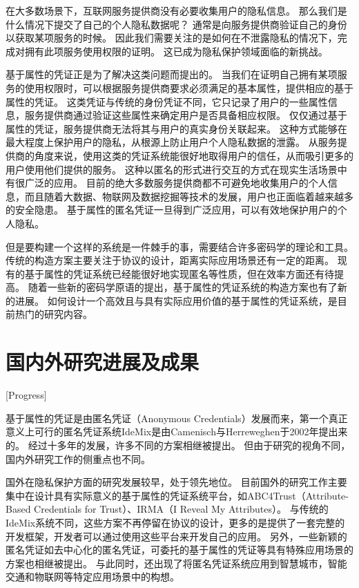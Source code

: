在大多数场景下，互联网服务提供商没有必要收集用户的隐私信息。
那么我们是什么情况下提交了自己的个人隐私数据呢？
通常是向服务提供商验证自己的身份以获取某项服务的时候。
因此我们需要关注的是如何在不泄露隐私的情况下，完成对拥有此项服务使用权限的证明。
这已成为隐私保护领域面临的新挑战。

基于属性的凭证正是为了解决这类问题而提出的。
当我们在证明自己拥有某项服务的使用权限时，可以根据服务提供商要求必须满足的基本属性，提供相应的基于属性的凭证。
这类凭证与传统的身份凭证不同，它只记录了用户的一些属性信息，服务提供商通过验证这些属性来确定用户是否具备相应权限。
仅仅通过基于属性的凭证，服务提供商无法将其与用户的真实身份关联起来。
这种方式能够在最大程度上保护用户的隐私，从根源上防止用户个人隐私数据的泄露。
从服务提供商的角度来说，使用这类的凭证系统能很好地取得用户的信任，从而吸引更多的用户使用他们提供的服务。
这种以匿名的形式进行交互的方式在现实生活场景中有很广泛的应用。
目前的绝大多数服务提供商都不可避免地收集用户的个人信息，而且随着大数据、物联网及数据挖掘等技术的发展，用户也正面临着越来越多的安全隐患。
基于属性的匿名凭证一旦得到广泛应用，可以有效地保护用户的个人隐私。

但是要构建一个这样的系统是一件棘手的事，需要结合许多密码学的理论和工具。
传统的构造方案主要关注于协议的设计，距离实际应用场景还有一定的距离。
现有的基于属性的凭证系统已经能很好地实现匿名等性质，但在效率方面还有待提高。
随着一些新的密码学原语的提出，基于属性的凭证系统的构造方案也有了新的进展。
如何设计一个高效且与具有实际应用价值的基于属性的凭证系统，是目前热门的研究内容。

\section{国内外研究进展及成果}[Progress]

基于属性的凭证是由匿名凭证（Anonymous Credentials）发展而来，第一个真正意义上可行的匿名凭证系统IdeMix是由Camenisch与Herreweghen于2002年提出来的\cite{camenisch2002design}。
经过十多年的发展，许多不同的方案相继被提出。
但由于研究的视角不同，国内外研究工作的侧重点也不同。

国外在隐私保护方面的研究发展较早，处于领先地位。
目前国外的研究工作主要集中在设计具有实际意义的基于属性的凭证系统平台，如ABC4Trust\cite{sabouri2012attribute}（Attribute-Based Credentials for Trust）、IRMA\cite{vullers2013efficient}（I Reveal My Attributes）。
与传统的IdeMix系统不同，这些方案不再停留在协议的设计，更多的是提供了一套完整的开发框架，开发者可以通过使用这些平台来开发自己的应用。
另外，一些新颖的匿名凭证如去中心化的匿名凭证\cite{garman2014decentralized}，可委托的基于属性的凭证\cite{blomer2018delegatable}等具有特殊应用场景的方案也相继被提出。
与此同时，还出现了将匿名凭证系统应用到智慧城市\cite{de2017assessment}，智能交通\cite{neven2017privacy}和物联网\cite{viejo2019secure}等特定应用场景中的构想。

